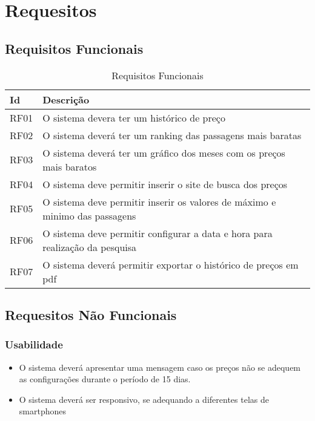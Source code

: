 \chapter[Requesitos]{Requesitos}

\section{Requisitos Funcionais}

\begin{table}[h]
	\begin{tabular}{@{}ll@{}}
		\toprule
			\textbf{Id} & 
			\textbf{Descrição}\\
		\midrule
			RF01 & O sistema devera ter um histórico de preço \\
			RF02 & O sistema deverá ter um ranking das passagens mais baratas \\
			RF03 & O sistema deverá ter um gráfico dos meses com os preços mais baratos \\
			RF04 & O sistema deve permitir inserir o site de busca dos preços \\
			RF05 & O sistema deve permitir inserir os valores de máximo e minimo das passagens \\
			RF06 & O sistema deve permitir configurar a data e hora para realização da pesquisa \\
			RF07 & O sistema deverá permitir exportar o histórico de preços em pdf \\
		\bottomrule
	\end{tabular}
	\caption{Requisitos Funcionais}
	\label{tab01}
\end{table}


\section{Requesitos Não Funcionais}

\subsection{Usabilidade}

\begin{itemize}

	\item O sistema deverá apresentar uma mensagem caso os preços não se adequem as configurações durante o período de 15 dias.
	\item O sistema deverá ser responsivo, se adequando a diferentes telas de smartphones

\end{itemize}


